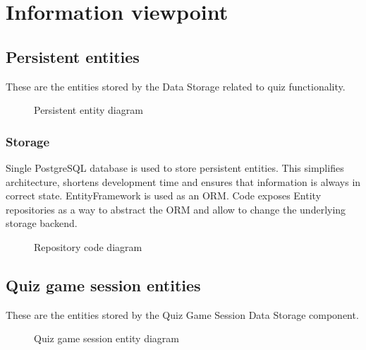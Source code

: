 \section{Information viewpoint}

\subsection{Persistent entities}

These are the entities stored by the Data Storage related to quiz functionality.

\begin{figure}[H]
  \caption{Persistent entity diagram}
  \label{fig:viewpoint-information-entity}
\end{figure}

\subsubsection{Storage}

Single PostgreSQL database is used to store persistent entities. This simplifies architecture, shortens development time and ensures that information is always in correct state. EntityFramework is used as an ORM. Code exposes Entity repositories as a way to abstract the ORM and allow to change the underlying storage backend.

\begin{figure}[H]
  \caption{Repository code diagram}
  \label{fig:viewpoint-information-repo}
\end{figure}

\subsection{Quiz game session entities}

These are the entities stored by the Quiz Game Session Data Storage component.

\begin{figure}[H]
  \caption{Quiz game session entity diagram}
  \label{fig:viewpoint-information-quiz-game-entities}
\end{figure}
